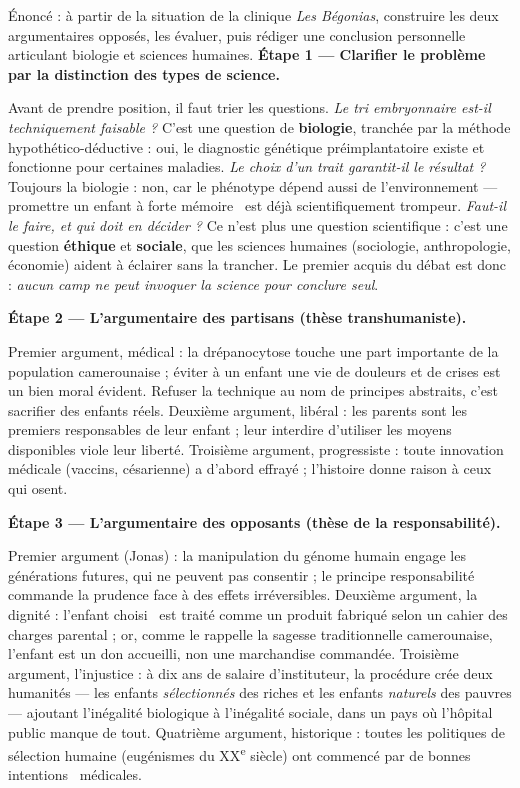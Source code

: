 \documentclass[11pt]{article}
\begin{document}
\begin{exoresolu}
Énoncé : à partir de la situation de la clinique \emph{Les Bégonias}, construire les deux argumentaires opposés, les évaluer, puis rédiger une conclusion personnelle articulant biologie et sciences humaines.
\tcblower
\textbf{Étape 1 — Clarifier le problème par la distinction des types de science.}

Avant de prendre position, il faut trier les questions. \emph{Le tri embryonnaire est-il techniquement faisable ?} C'est une question de \textbf{biologie}, tranchée par la méthode hypothético-déductive : oui, le diagnostic génétique préimplantatoire existe et fonctionne pour certaines maladies. \emph{Le choix d'un trait garantit-il le résultat ?} Toujours la biologie : non, car le phénotype dépend aussi de l'environnement — promettre un enfant \guillemotleft à forte mémoire \guillemotright\ est déjà scientifiquement trompeur. \emph{Faut-il le faire, et qui doit en décider ?} Ce n'est plus une question scientifique : c'est une question \textbf{éthique} et \textbf{sociale}, que les sciences humaines (sociologie, anthropologie, économie) aident à éclairer sans la trancher. Le premier acquis du débat est donc : \emph{aucun camp ne peut invoquer la science pour conclure seul}.

\textbf{Étape 2 — L'argumentaire des partisans (thèse transhumaniste).}

Premier argument, médical : la drépanocytose touche une part importante de la population camerounaise ; éviter à un enfant une vie de douleurs et de crises est un bien moral évident. Refuser la technique au nom de principes abstraits, c'est sacrifier des enfants réels. Deuxième argument, libéral : les parents sont les premiers responsables de leur enfant ; leur interdire d'utiliser les moyens disponibles viole leur liberté. Troisième argument, progressiste : toute innovation médicale (vaccins, césarienne) a d'abord effrayé ; l'histoire donne raison à ceux qui osent.

\textbf{Étape 3 — L'argumentaire des opposants (thèse de la responsabilité).}

Premier argument (Jonas) : la manipulation du génome humain engage les générations futures, qui ne peuvent pas consentir ; le principe responsabilité commande la prudence face à des effets irréversibles. Deuxième argument, la dignité : l'enfant \guillemotleft choisi \guillemotright\ est traité comme un produit fabriqué selon un cahier des charges parental ; or, comme le rappelle la sagesse traditionnelle camerounaise, l'enfant est un don accueilli, non une marchandise commandée. Troisième argument, l'injustice : à dix ans de salaire d'instituteur, la procédure crée deux humanités — les enfants \emph{sélectionnés} des riches et les enfants \emph{naturels} des pauvres — ajoutant l'inégalité biologique à l'inégalité sociale, dans un pays où l'hôpital public manque de tout. Quatrième argument, historique : toutes les politiques de sélection humaine (eugénismes du XX\textsuperscript{e} siècle) ont commencé par de \guillemotleft bonnes intentions \guillemotright\ médicales.


\end{exoresolu}
\end{document}
